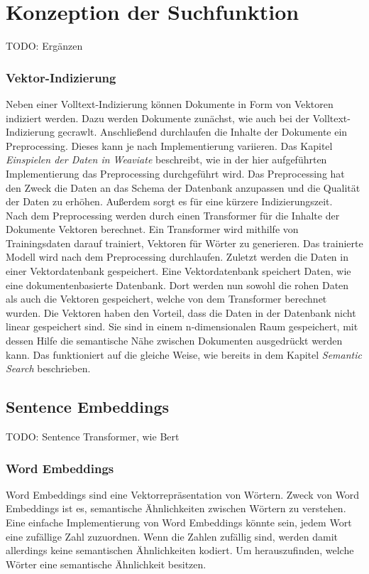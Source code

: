 \chapter{Konzeption der Suchfunktion}
TODO: Ergänzen

\subsection{Vektor-Indizierung}
Neben einer Volltext-Indizierung können Dokumente in Form von Vektoren indiziert werden.
Dazu werden Dokumente zunächst, wie auch bei der Volltext-Indizierung gecrawlt.
Anschließend durchlaufen die Inhalte der Dokumente ein Preprocessing.
Dieses kann je nach Implementierung variieren.
Das Kapitel \textit{Einspielen der Daten in Weaviate} beschreibt, wie in der hier aufgeführten Implementierung das Preprocessing durchgeführt wird.
Das Preprocessing hat den Zweck die Daten an das Schema der Datenbank anzupassen und die Qualität der Daten zu erhöhen.
Außerdem sorgt es für eine kürzere Indizierungszeit.\\

Nach dem Preprocessing werden durch einen Transformer für die Inhalte der Dokumente Vektoren berechnet.
Ein Transformer wird mithilfe von Trainingsdaten darauf trainiert, Vektoren für Wörter zu generieren.
Das trainierte Modell wird nach dem Preprocessing durchlaufen.
Zuletzt werden die Daten in einer Vektordatenbank gespeichert.
Eine Vektordatenbank speichert Daten, wie eine dokumentenbasierte Datenbank.
Dort werden nun sowohl die rohen Daten als auch die Vektoren gespeichert, welche von dem Transformer berechnet wurden.
Die Vektoren haben den Vorteil, dass die Daten in der Datenbank nicht linear gespeichert sind.
Sie sind in einem n-dimensionalen Raum gespeichert, mit dessen Hilfe die semantische Nähe zwischen Dokumenten ausgedrückt werden kann.
Das funktioniert auf die gleiche Weise, wie bereits in dem Kapitel \textit{Semantic Search} beschrieben.

\section{Sentence Embeddings}
TODO: Sentence Transformer, wie Bert
\cite{Reimers_Gurevych_2019}

\subsection{Word Embeddings}
Word Embeddings sind eine Vektorrepräsentation von Wörtern.
Zweck von Word Embeddings ist es, semantische Ähnlichkeiten zwischen Wörtern zu verstehen.
Eine einfache Implementierung von Word Embeddings könnte sein, jedem Wort eine zufällige Zahl zuzuordnen.
Wenn die Zahlen zufällig sind, werden damit allerdings keine semantischen Ähnlichkeiten kodiert.
Um herauszufinden, welche Wörter eine semantische Ähnlichkeit besitzen.

